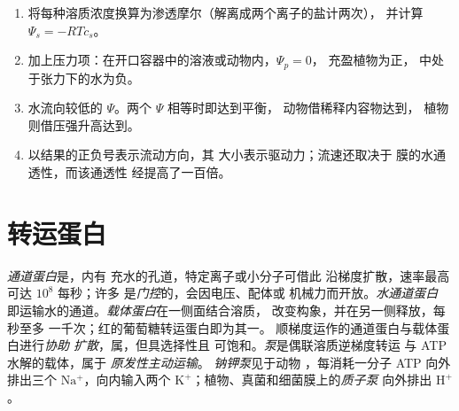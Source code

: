 \begin{method}[水势计算]\label{met:b1:membranes-transport:psi}
\begin{enumerate}
  \item 将每种溶质浓度换算为渗透摩尔（解离成两个离子的盐计两次），
        并计算 $\Psi_s =
        -RTc_s$。
  \item 加上压力项：在开口容器中的溶液或动物内，$\Psi_p = 0$，
        充盈植物为正，
        中处于张力下的水为负。
  \item 水流向较低的 $\Psi$。两个 $\Psi$ 相等时即达到平衡，
        动物借稀释内容物达到，
        植物则借压强升高达到。
  \item 以结果的正负号表示流动方向，其
        大小表示驱动力；流速还取决于
        膜的水通透性，而该通透性
        经提高了一百倍。
\end{enumerate}
\end{method}

\section{转运蛋白}

\begin{definition}\label{def:b1:membranes-transport:transporters}
\emph{通道蛋白}是，内有
充水的孔道，特定离子或小分子可借此
沿梯度扩散，速率最高可达 $10^8$ 每秒；许多
是\emph{门控}的，会因电压、配体或
机械力而开放。\emph{水通道蛋白}
即运输水的通道。\emph{载体蛋白}在一侧面结合溶质，
改变构象，并在另一侧释放，每秒至多
一千次；红的葡萄糖转运蛋白即为其一。
顺梯度运作的通道蛋白与载体蛋白进行\emph{协助
扩散}，属，但具选择性且
可饱和。\emph{泵}是偶联溶质逆梯度转运
与 ATP 水解的载体，属于
\emph{原发性主动运输}。
\emph{钠钾泵}见于动物
，每消耗一分子 ATP 向外排出三个 $\mathrm{Na^+}$，向内输入两个
$\mathrm{K^+}$；植物、真菌和细菌膜上的\emph{质子泵}
向外排出 $\mathrm{H^+}$。
\end{definition}

